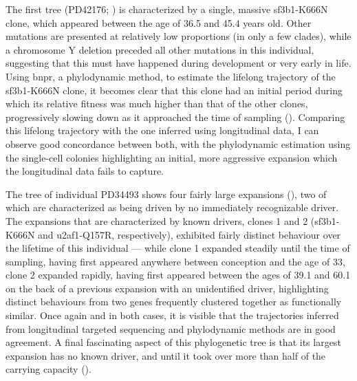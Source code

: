The first tree (PD42176; ) is characterized by a single, massive \ac{sf3b1}-K666N clone, which appeared between the age of 36.5 and 45.4 years old. Other mutations are presented at relatively low proportions (in only a few clades), while a chromosome Y deletion preceded all other mutations in this individual, suggesting that this must have happened during development or very early in life. Using \ac{bnpr}, a phylodynamic method, to estimate the lifelong trajectory of the \ac{sf3b1}-K666N clone, it becomes clear that this clone had an initial period during which its relative fitness was much higher than that of the other clones, progressively slowing down as it approached the time of sampling (). Comparing this lifelong trajectory with the one inferred using longitudinal data, I can observe good concordance between both, with the phylodynamic estimation using the single-cell colonies highlighting an initial, more aggressive expansion which the longitudinal data fails to capture.

\begin{figure}[!ht]
	\label{fig:tree-pd42176}
\end{figure}

The tree of individual PD34493 shows four fairly large expansions (), two of which are characterized as being driven by no immediately recognizable driver. The expansions that are characterized by known drivers, clones 1 and 2 (\ac{sf3b1}-K666N and \ac{u2af1}-Q157R, respectively), exhibited fairly distinct behaviour over the lifetime of this individual --- while clone 1 expanded steadily until the time of sampling, having first appeared anywhere between conception and the age of 33, clone 2 expanded rapidly, having first appeared between the ages of 39.1 and 60.1 on the back of a previous expansion with an unidentified driver, highlighting distinct behaviours from two genes frequently clustered together as functionally similar. Once again and in both cases, it is visible that the trajectories inferred from longitudinal targeted sequencing and phylodynamic methods are in good agreement. A final fascinating aspect of this phylogenetic tree is that its largest expansion has no known driver, and until it took over more than half of the carrying capacity (). 

